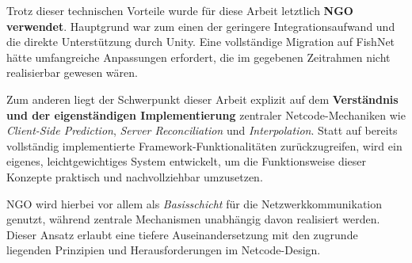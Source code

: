 Trotz dieser technischen Vorteile wurde für diese Arbeit letztlich \textbf{NGO verwendet}. Hauptgrund war zum einen der geringere Integrationsaufwand und die direkte Unterstützung durch Unity. Eine vollständige Migration auf FishNet hätte umfangreiche Anpassungen erfordert, die im gegebenen Zeitrahmen nicht realisierbar gewesen wären.

Zum anderen liegt der Schwerpunkt dieser Arbeit explizit auf dem \textbf{Verständnis und der eigenständigen Implementierung} zentraler Netcode-Mechaniken wie \textit{Client-Side Prediction}, \textit{Server Reconciliation} und \textit{Interpolation}. Statt auf bereits vollständig implementierte Framework-Funktionalitäten zurückzugreifen, wird ein eigenes, leichtgewichtiges System entwickelt, um die Funktionsweise dieser Konzepte praktisch und nachvollziehbar umzusetzen.

NGO wird hierbei vor allem als \textit{Basisschicht} für die Netzwerkkommunikation genutzt, während zentrale Mechanismen unabhängig davon realisiert werden. Dieser Ansatz erlaubt eine tiefere Auseinandersetzung mit den zugrunde liegenden Prinzipien und Herausforderungen im Netcode-Design.
